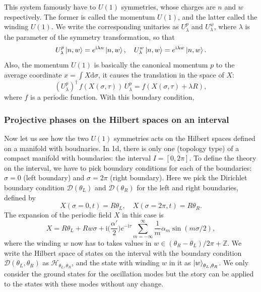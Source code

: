 \documentclass[
]{scrartcl}
\numberwithin{equation}{section}
\theoremstyle{definition}
\theoremstyle{definition}
\theoremstyle{definition}
\theoremstyle{definition}
\theoremstyle{remark}
\begin{document}
This system famously have to \(U(1)\) symmetries, whose charges are \(n\) and \(w\) respectively. The former is called the momentum \(U(1)\), and the latter called the winding \(U(1)\).
We write the corresponding unitaries as \(U^p_\lambda\) and \(U^w_\lambda\), where \(\lambda\) is the parameter of the symmetry transformation, so that
\begin{equation}
    \label{eq:UpwAct}
    U^p_\lambda \ket{n,w} = e^{\mathrm{i}\lambda n }\ket{n,w},\quad
    U^w_\lambda \ket{n,w} = e^{\mathrm{i}\lambda w }\ket{n,w}.
\end{equation}
Also, the momentum \(U(1)\) is basically the canonical momentum \(p\) to the average coordinate \(x = \int X \mathrm{d}\sigma\), it causes the translation in the space of \(X\):
\begin{equation}
    \label{eq:UpActX}
    (U^p_{\lambda})^\dagger\, f(X(\sigma,\tau)) \, U^p_{\lambda} = 
    f(X(\sigma,\tau) + \lambda R),
\end{equation}
where \(f\) is a periodic function.
With this boundary condition,

\hypertarget{projective-phases-on-the-hilbert-spaces-on-an-interval}{%
\subsubsection{Projective phases on the Hilbert spaces on an interval}\label{projective-phases-on-the-hilbert-spaces-on-an-interval}}

Now let us see how the two \(U(1)\) symmetries acts on the Hilbert spaces defined on a manifold with boudnaries. In 1d, there is only one (topology type) of a compact manifold with boundaries: the interval \(I = [0,2\pi]\).
To define the theory on the interval, we have to pick boundary conditions for each of the boundaries: \(\sigma =0\) (left boundary) and \(\sigma =2\pi\) (right boundary).
Here we pick the Dirichlet boundary condition \(\mathcal{D}(\theta_L)\) and \(\mathcal{D}(\theta_R)\) for the left and right boundaries,
defined by
\begin{equation}
    \label{eq:Dirichlet}
    X(\sigma = 0,t) = R \theta_L, \quad X(\sigma = 2\pi, t)= R \theta_R.
\end{equation}
The expansion of the periodic field \(X\) in this case is
\begin{equation}
    \label{eq:XexpDirichlet}
    X = R\theta_L + R w \sigma + \mathrm{i}\bigl(\frac{\alpha'}{2}\bigr) e^{-\mathrm{i}\tau} \sum_{m = -\infty}^{\infty}  \frac1m \alpha_m \sin(m \sigma/2),
\end{equation}
where the winding \(w\) now has to takes values in \(w \in (\theta_R-\theta_L)/2\pi + \mathbb{Z}\).
We write the Hilbert space of states on the interval with the boundary condition \(\mathcal{D}(\theta_L,\theta_R)\) as \(\mathcal{H}_{\theta_L,\theta_R}\), and the state with winding \(w\) in it as \(\ket{w}_{\theta_L,\theta_R}\). We only consider the ground states for the oscillation modes but the story can be applied to the states with these modes without any change.
\end{document}
